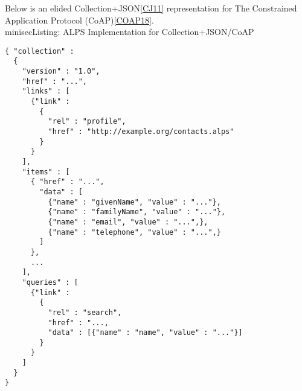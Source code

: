 \documentclass{wsrest2014}
\begin{document}
 \par{}Below is an elided Collection+JSON\hyperlink{CJ11}{[CJ11]} representation for The Constrained Application Protocol (CoAP)\hyperlink{COAP18}{[COAP18]}.
\\minisec{Listing: ALPS Implementation for Collection+JSON/CoAP}
\begin{verbatim}{ "collection" :
  {
    "version" : "1.0",
    "href" : "...",
    "links" : [
      {"link" :
        {
          "rel" : "profile",
          "href" : "http://example.org/contacts.alps"
        }
      }
    ],
    "items" : [
      { "href" : "...",
        "data" : [
          {"name" : "givenName", "value" : "..."},
          {"name" : "familyName", "value" : "..."},
          {"name" : "email", "value" : "...",},
          {"name" : "telephone", "value" : "...",}
        ]
      },
      ...
    ],
    "queries" : [
      {"link" :
        {
          "rel" : "search",
          "href" : "...,
          "data" : [{"name" : "name", "value" : "..."}]
        }
      }
    ]
  }
}\end{verbatim}

\hypertarget{_compliance_for_clients_and_servers}{}
\end{document}
